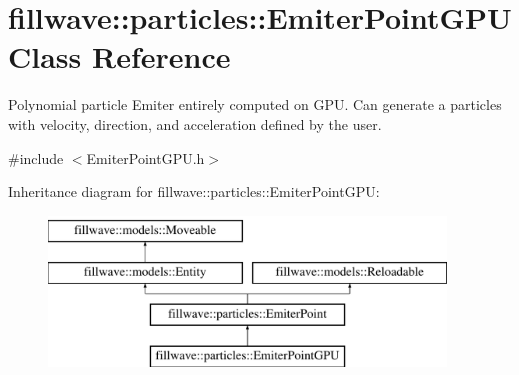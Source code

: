 \hypertarget{classfillwave_1_1particles_1_1EmiterPointGPU}{}\section{fillwave\+:\+:particles\+:\+:Emiter\+Point\+G\+P\+U Class Reference}
\label{classfillwave_1_1particles_1_1EmiterPointGPU}


Polynomial particle Emiter entirely computed on G\+P\+U. Can generate a particles with velocity, direction, and acceleration defined by the user.  




{\ttfamily \#include $<$Emiter\+Point\+G\+P\+U.\+h$>$}

Inheritance diagram for fillwave\+:\+:particles\+:\+:Emiter\+Point\+G\+P\+U\+:\begin{figure}[H]
\begin{center}
\leavevmode
\includegraphics[height=4.000000cm]{classfillwave_1_1particles_1_1EmiterPointGPU}
\end{center}
\end{figure}
